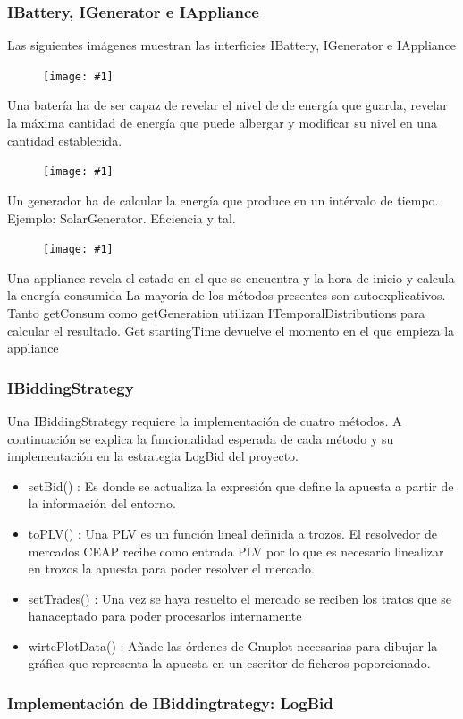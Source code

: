 \documentclass[12pt,a4paper,openright,oneside]{article}
\newcommand{\includeImage}[1]
{
	\begin{figure}[htb]
	\begin{center}
	\texttt{[image: \#1]}
	\end{center}
	\end{figure}
}
\numberwithin{equation}{section}
\theoremstyle{definition}
\begin{document}
\subsubsection{IBattery, IGenerator e IAppliance}
Las siguientes imágenes muestran las interficies IBattery, IGenerator e IAppliance
\includeImage{interficie_battery.png}
Una batería ha de ser capaz de revelar el nivel de de energía que guarda, revelar la máxima cantidad de energía que puede albergar y modificar su nivel en una cantidad establecida.
\includeImage{interficie_generator.png}
Un generador ha de calcular la energía que produce en un intérvalo de tiempo.
Ejemplo: SolarGenerator. Eficiencia y tal.
\includeImage{interficie_appliance.png}
Una appliance revela el estado en el que se encuentra y la hora de inicio y calcula la energía consumida 
La mayoría de los métodos presentes son autoexplicativos. Tanto getConsum como getGeneration utilizan ITemporalDistributions para calcular el resultado. Get startingTime devuelve el momento en el que empieza la appliance
\subsubsection{IBiddingStrategy}

Una IBiddingStrategy requiere la implementación de cuatro métodos. A continuación se explica la funcionalidad esperada de cada método y su implementación en la estrategia LogBid del proyecto.
\begin{itemize}
\item setBid() : Es donde se actualiza la expresión que define la apuesta a partir de la información del entorno.
\item toPLV() : Una PLV es un función lineal definida a trozos. El resolvedor de mercados CEAP recibe como entrada PLV por lo que es necesario linealizar en trozos la apuesta para poder resolver el mercado. 
\item setTrades() : Una vez se haya resuelto el mercado se reciben los tratos que se hanaceptado para poder procesarlos internamente
\item wirtePlotData() : Añade las órdenes de Gnuplot necesarias para dibujar la gráfica que representa la apuesta en un escritor de ficheros poporcionado.
\end{itemize}
\subsubsection{Implementación de IBiddingtrategy: LogBid}
\end{document}

